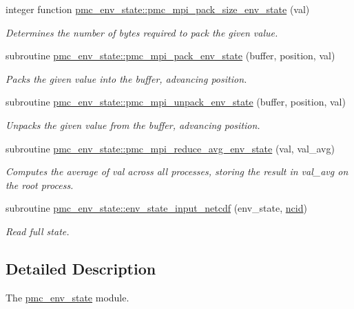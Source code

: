 \begin{DoxyCompactItemize}
integer function \mbox{\hyperlink{namespacepmc__env__state_ade49d8dfe1865485f6648200824a8aa2}{pmc\+\_\+env\+\_\+state\+::pmc\+\_\+mpi\+\_\+pack\+\_\+size\+\_\+env\+\_\+state}} (val)
\begin{DoxyCompactList}\small\item\em Determines the number of bytes required to pack the given value. \end{DoxyCompactList}\item 
subroutine \mbox{\hyperlink{namespacepmc__env__state_a480b54f036d88d6640bf278ce8677987}{pmc\+\_\+env\+\_\+state\+::pmc\+\_\+mpi\+\_\+pack\+\_\+env\+\_\+state}} (buffer, position, val)
\begin{DoxyCompactList}\small\item\em Packs the given value into the buffer, advancing position. \end{DoxyCompactList}\item 
subroutine \mbox{\hyperlink{namespacepmc__env__state_a29321768e4beec8bedc30f795b89a945}{pmc\+\_\+env\+\_\+state\+::pmc\+\_\+mpi\+\_\+unpack\+\_\+env\+\_\+state}} (buffer, position, val)
\begin{DoxyCompactList}\small\item\em Unpacks the given value from the buffer, advancing position. \end{DoxyCompactList}\item 
subroutine \mbox{\hyperlink{namespacepmc__env__state_a4c7aa1ae763cf16b0380f1bcaaa4bff5}{pmc\+\_\+env\+\_\+state\+::pmc\+\_\+mpi\+\_\+reduce\+\_\+avg\+\_\+env\+\_\+state}} (val, val\+\_\+avg)
\begin{DoxyCompactList}\small\item\em Computes the average of val across all processes, storing the result in val\+\_\+avg on the root process. \end{DoxyCompactList}\item 
subroutine \mbox{\hyperlink{namespacepmc__env__state_a0d8b675986137899087a12f1c7abe24b}{pmc\+\_\+env\+\_\+state\+::env\+\_\+state\+\_\+input\+\_\+netcdf}} (env\+\_\+state, \mbox{\hyperlink{fractal_8_f90_a4e89f3f850921ff84a6dfce8b166ad50}{ncid}})
\begin{DoxyCompactList}\small\item\em Read full state. \end{DoxyCompactList}\end{DoxyCompactItemize}


\subsection{Detailed Description}
The \mbox{\hyperlink{namespacepmc__env__state}{pmc\+\_\+env\+\_\+state}} module. 

